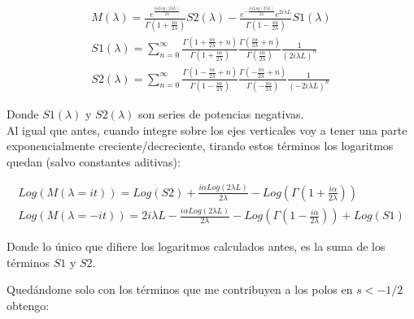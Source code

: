 \begin{equation}
\begin{array}{c}
M( \lambda ) = 
 \frac{ e ^{   \frac{i \alpha Log \left(2 \lambda L \right) } 
           {2 \lambda } } }
      { \Gamma \left( 1 + \frac{i \alpha}{2 \lambda}  \right)   } S2 ( \lambda ) -
 \frac{e ^{ - \frac{i \alpha Log \left( 2 \lambda L \right) }{2 \lambda } } e ^{2 i \lambda L } }
      { \Gamma \left( 1 - \frac{i \alpha}{2 \lambda}  \right) } S1 ( \lambda ) \\
      
S1 ( \lambda ) = \sum _{n=0} ^{ \infty }
\frac{\Gamma (1 + \frac{i \alpha}{2 \lambda} + n )}{\Gamma (1 + \frac{i \alpha}{2 \lambda})} 
\frac{\Gamma (\frac{i \alpha}{2 \lambda} + n )}{\Gamma (\frac{i \alpha}{2 \lambda})} 
\frac{1}{( 2 i \lambda L ) ^n} \\

S2 (\lambda ) = \sum _{n=0 } ^{\infty}
\frac{ \Gamma ( 1- \frac{i \alpha}{2 \lambda } + n ) }{\Gamma ( 1- \frac{i \alpha}{2 \lambda } )}
\frac{\Gamma (- \frac{i \alpha }{2 \lambda} + n )}{\Gamma (- \frac{i \alpha }{2 \lambda} )}
\frac{1}{( - 2 i \lambda L ) ^n}
\end{array}
\end{equation}

Donde $S1 (\lambda ) $ y $S2 (\lambda)$ son series de potencias negativas.  \\

Al igual que antes, cuando integre sobre los ejes verticales voy a tener una parte exponencialmente creciente/decreciente, tirando estos términos los logaritmos quedan (salvo constantes aditivas):

\begin{equation}
\begin{array}{c}

Log ( M ( \lambda = i t ) ) =  Log(S2) + 
\frac{i \alpha Log(2 \lambda L)}{2 \lambda} - Log( \Gamma( 1 + \frac{i \alpha}{2 \lambda} ) ) \\

Log( M ( \lambda = -i t ) ) = 2 i \lambda L - \frac{i \alpha Log( 2 \lambda L )}{2 \lambda} - 
Log( \Gamma ( 1 - \frac{i \alpha}{2 \lambda} )) + Log(S1)

\end{array}
\end{equation}

Donde lo único que difiere los logaritmos calculados antes, es la suma de los términos $S1$ y $S2$.

Quedándome solo con los términos que me contribuyen a los polos en  $s < -1/2$ obtengo:

